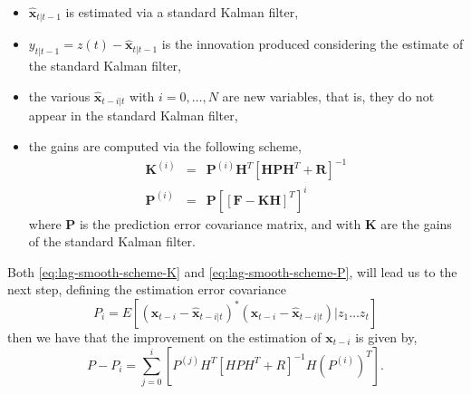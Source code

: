 \begin{itemize}
\item $\hat{\textbf{x}}_{t|t-1}$ is estimated via a standard Kalman filter,
\item $y_{t|t-1} = z(t) - \hat{\textbf{x}}_{t|t-1}$ is the innovation produced considering the estimate of the standard Kalman filter,
\item the various $\hat{\textbf{x}}_{t-i|t}$ with $i = 0,\ldots,N$ are new variables, that is, they do not appear in the standard Kalman filter,
\item the gains are computed via the following scheme,
\begin{subequations}
\begin{eqnarray}
\mathbf{K}^{(i)} &=& \mathbf{P}^{(i)} \mathbf{H}^{T} \left[ \mathbf{H P H}^{T} + \mathbf{R} \right]^{-1} \label{eq:lag-smooth-scheme-K} \\
\mathbf{P}^{(i)} &=& \mathbf{P} \left[ \left[ \mathbf{F} - \mathbf{K H} \right]^{T} \right]^{i} \label{eq:lag-smooth-scheme-P}
\end{eqnarray}
\end{subequations}
where $\mathbf{P}$ is the prediction error covariance matrix, and with $\mathbf{K}$ are the gains of the standard Kalman filter.
\end{itemize}

Both \eqref{eq:lag-smooth-scheme-K} and \eqref{eq:lag-smooth-scheme-P}, will lead us to the next step, defining the estimation error covariance
\[
P_{i} = E \left[ \left( \textbf{x}_{t-i} - \hat{\textbf{x}}_{t-i|t} \right)^{*} \left( \textbf{x}_{t-i} - \hat{\textbf{x}}_{t-i|t} \right) | z_{1} \ldots z_{t} \right]
\]
then we have that the improvement on the estimation of $\textbf{x}_{t-i}$ is given by,
\[
P - P_{i} = \sum_{j = 0}^{i} \left[ P^{(j)} H^{T} \left[ H P H^{T} + R \right]^{-1} H \left( P^{(i)} \right)^{T} \right].
\]
